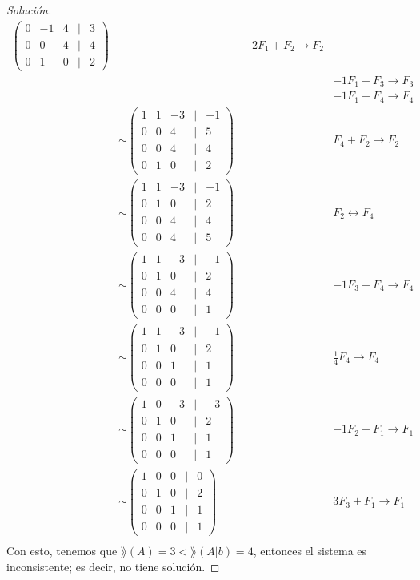 \documentclass[a4,11pt]{aleph-notas}
\begin{document}
\begin{proof}[Solución]
\begin{align*}
\begin{pmatrix}
            0&-1&4&|&3\\
            0&0&4&|&4\\
            0&1&0&|&2
        \end{pmatrix}
        && -2F_1+F_2\to F_2\\
        &&&-1F_1+F_3\to F_3\\
        &&&-1F_1+F_4\to F_4\\
        & \sim 
        \begin{pmatrix}
            1&1&-3&|&-1\\
            0&0&4&|&5\\
            0&0&4&|&4\\
            0&1&0&|&2
        \end{pmatrix}
        && F_4+F_2\to F_2\\
        & \sim 
        \begin{pmatrix}
            1&1&-3&|&-1\\
            0&1&0&|&2\\
            0&0&4&|&4\\
            0&0&4&|&5
        \end{pmatrix}
        && F_2 \leftrightarrow F_4\\
        & \sim 
        \begin{pmatrix}
            1&1&-3&|&-1\\
            0&1&0&|&2\\
            0&0&4&|&4\\
            0&0&0&|&1
        \end{pmatrix}
        && -1F_3+F_4\to F_4\\
        & \sim 
        \begin{pmatrix}
            1&1&-3&|&-1\\
            0&1&0&|&2\\
            0&0&1&|&1\\
            0&0&0&|&1
        \end{pmatrix}
        && \frac{1}{4}F_4\to F_4\\
         & \sim 
        \begin{pmatrix}
            1&0&-3&|&-3\\
            0&1&0&|&2\\
            0&0&1&|&1\\
            0&0&0&|&1
        \end{pmatrix}
        && -1F_2+F_1\to F_1\\
        & \sim 
        \begin{pmatrix}
            1&0&0&|&0\\
            0&1&0&|&2\\
            0&0&1&|&1\\
            0&0&0&|&1
        \end{pmatrix}
        && 3F_3+F_1\to F_1\\
    \end{align*}
    Con esto, tenemos que $\rang(A)=3 < \rang(A|b) = 4$, entonces el sistema es inconsistente; es decir, no tiene solución.
\end{proof}
\end{document}

